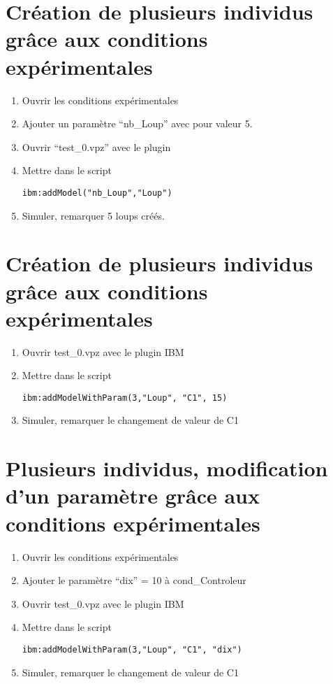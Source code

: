 \documentclass[a4paper,11pt,final]{article}
\begin{document}
\section{Création de plusieurs individus grâce aux conditions expérimentales} 
\begin{enumerate}
	  \item Ouvrir les conditions expérimentales
	  \item Ajouter un paramètre ``nb\_Loup'' avec pour valeur 5.
	  \item Ouvrir ``test\_0.vpz'' avec le plugin
	  \item Mettre dans le script
	  \begin{lstlisting}[frame=single]
ibm:addModel("nb_Loup","Loup")
\end{lstlisting}
	  \item Simuler, remarquer 5 loups créés.
\end{enumerate}

\section{Création de plusieurs individus grâce aux conditions expérimentales} 
\begin{enumerate}
	  \item Ouvrir test\_0.vpz avec le plugin IBM
	  \item Mettre dans le script
	  \begin{lstlisting}[frame=single]
ibm:addModelWithParam(3,"Loup", "C1", 15)
\end{lstlisting}
	  \item Simuler, remarquer le changement de valeur de C1
\end{enumerate}

\section{Plusieurs individus, modification d'un paramètre grâce aux conditions expérimentales} 
\begin{enumerate}
	  \item Ouvrir les conditions expérimentales
	  \item Ajouter le paramètre ``dix'' = 10 à cond\_Controleur
	  \item Ouvrir test\_0.vpz avec le plugin IBM
	  \item Mettre dans le script 
	  \begin{lstlisting}[frame=single]
ibm:addModelWithParam(3,"Loup", "C1", "dix")
\end{lstlisting}
	\item Simuler, remarquer le changement de valeur de C1
\end{enumerate}
\end{document}
